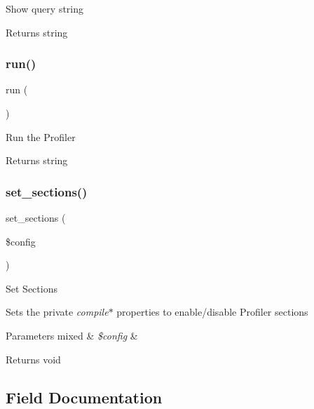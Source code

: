 Show query string

\begin{DoxyReturn}{Returns}
string 
\end{DoxyReturn}
\mbox{\label{class_c_i___profiler_afb0fafe7e02a3ae1993c01c19fad2bae}} 
\subsubsection{\texorpdfstring{run()}{run()}}
{\footnotesize\ttfamily run (\begin{DoxyParamCaption}{ }\end{DoxyParamCaption})}

Run the Profiler

\begin{DoxyReturn}{Returns}
string 
\end{DoxyReturn}
\mbox{\label{class_c_i___profiler_a81c587d7a2a249d05f28c96a135591f7}} 
\subsubsection{\texorpdfstring{set\+\_\+sections()}{set\_sections()}}
{\footnotesize\ttfamily set\+\_\+sections (\begin{DoxyParamCaption}\item[{}]{\$config }\end{DoxyParamCaption})}

Set Sections

Sets the private {\itshape compile}$\ast$ properties to enable/disable Profiler sections


\begin{DoxyParams}[1]{Parameters}
mixed & {\em \$config} & \\
\hline
\end{DoxyParams}
\begin{DoxyReturn}{Returns}
void 
\end{DoxyReturn}


\subsection{Field Documentation}
\mbox{\label{class_c_i___profiler_ae30756727f63d3be7422d378676f667d}} 

